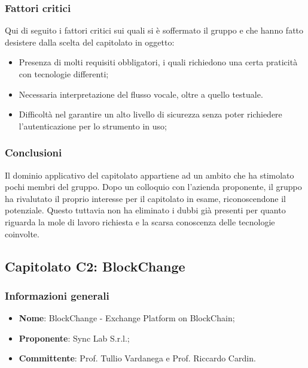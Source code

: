 \documentclass[11pt]{article}
\begin{document}
    \subsubsection{Fattori critici}
    Qui di seguito i fattori critici sui quali si è soffermato il gruppo e che hanno fatto desistere dalla scelta del capitolato in
    oggetto:
    	\begin{itemize}
            \item Presenza di molti requisiti obbligatori, i quali richiedono una certa praticità con tecnologie differenti;
            \item Necessaria interpretazione del flusso vocale, oltre a quello testuale.
            \item Difficoltà nel garantire un alto livello di sicurezza senza poter richiedere l'autenticazione per lo strumento in uso;
        \end{itemize}
        
    \subsubsection{Conclusioni}
    Il dominio applicativo del capitolato appartiene ad un ambito che ha stimolato pochi membri del gruppo.
    Dopo un colloquio con l'azienda proponente, il gruppo ha rivalutato il proprio interesse per il capitolato in esame, riconoscendone il potenziale.
    Questo tuttavia non ha eliminato i dubbi già presenti per quanto riguarda la mole di lavoro richiesta e la scarsa conoscenza delle tecnologie coinvolte.
    
    \newpage


\subsection{Capitolato C2: BlockChange}

    \subsubsection{Informazioni generali}
    \begin{itemize}
        \item \textbf{Nome}: BlockChange - Exchange Platform on BlockChain;
        \item \textbf{Proponente}: Sync Lab S.r.l.;
        \item \textbf{Committente}: Prof. Tullio Vardanega e Prof. Riccardo Cardin.
    \end{itemize}
    
\end{document}

